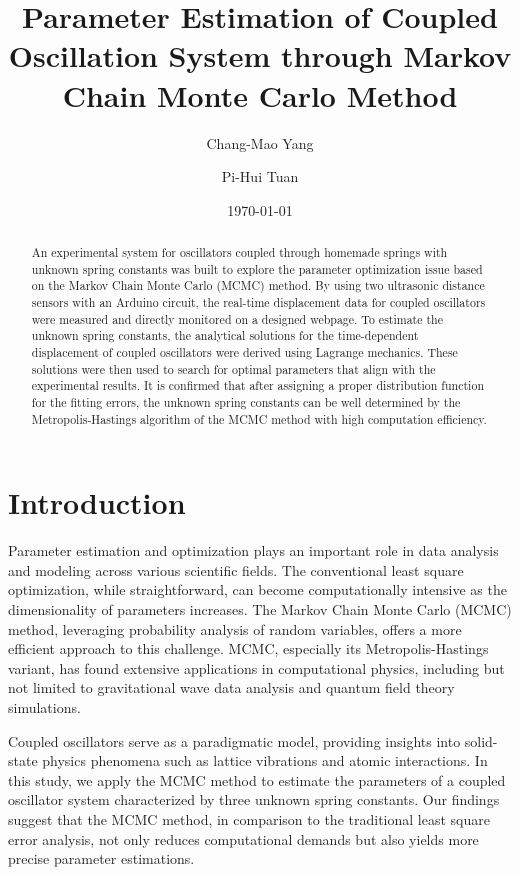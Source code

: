 \documentclass[12pt, a4paper, reprint, nofootinbib, twoside,  showkeys]{revtex4-1}
\begin{document}
	\title{Parameter Estimation of Coupled Oscillation System through Markov Chain Monte Carlo Method}
	\author{Chang-Mao Yang}
	\author{Pi-Hui Tuan}
	
	\date{\today}
\begin{abstract}
	An experimental system for oscillators coupled through homemade springs with unknown spring constants was built to explore the parameter optimization issue based on the Markov Chain Monte Carlo (MCMC) method. By using two ultrasonic distance sensors with an Arduino circuit, the real-time displacement data for coupled oscillators were measured and directly monitored on a designed webpage. To estimate the unknown spring constants, the analytical solutions for the time-dependent displacement of coupled oscillators were derived using Lagrange mechanics. These solutions were then used to search for optimal parameters that align with the experimental results. It is confirmed that after assigning a proper distribution function for the fitting errors, the unknown spring constants can be well determined by the Metropolis-Hastings algorithm of the MCMC method with high computation efficiency.
\end{abstract}
	\maketitle
\section{Introduction}
	Parameter estimation and optimization plays an important role in data analysis and modeling across various scientific fields. The conventional least square optimization, while straightforward, can become computationally intensive as the dimensionality of parameters increases. The Markov Chain Monte Carlo (MCMC) method, leveraging probability analysis of random variables, offers a more efficient approach to this challenge. MCMC, especially its Metropolis-Hastings variant, has found extensive applications in computational physics, including but not limited to gravitational wave data analysis and quantum field theory simulations.

Coupled oscillators serve as a paradigmatic model, providing insights into solid-state physics phenomena such as lattice vibrations and atomic interactions. In this study, we apply the MCMC method to estimate the parameters of a coupled oscillator system characterized by three unknown spring constants. Our findings suggest that the MCMC method, in comparison to the traditional least square error analysis, not only reduces computational demands but also yields more precise parameter estimations.
\end{document}
